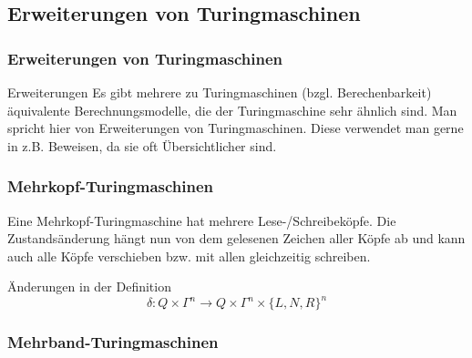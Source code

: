 \documentclass{beamer}
\begin{document}
{\subsection{Erweiterungen von Turingmaschinen}
\begin{frame}
\frametitle{Erweiterungen von Turingmaschinen}
\begin{block}{Erweiterungen}
Es gibt mehrere zu Turingmaschinen (bzgl. Berechenbarkeit) äquivalente Berechnungsmodelle, die der Turingmaschine sehr ähnlich sind. Man spricht hier von Erweiterungen von Turingmaschinen. Diese verwendet man gerne in z.B. Beweisen, da sie oft Übersichtlicher sind.
\end{block}
\end{frame}
\begin{frame}
\frametitle{Mehrkopf-Turingmaschinen}
\vspace{-2cm}
\begin{figure}[H]
\begin{center}
\end{center}
\end{figure}
Eine Mehrkopf-Turingmaschine hat mehrere Lese-/Schreibeköpfe. Die Zustandsänderung hängt nun von dem gelesenen Zeichen aller Köpfe ab und kann auch alle Köpfe verschieben bzw. mit allen gleichzeitig schreiben.
\begin{block}{Änderungen in der Definition}
$$ \delta: Q \times \Gamma^n \rightarrow Q \times \Gamma^n \times \{L,N,R\}^n$$
\end{block}
\end{frame}

\begin{frame}
\frametitle{Mehrband-Turingmaschinen}
\vspace{-2cm}
\begin{figure}[H]
\begin{center}
\end{center}
\end{figure}
\end{frame}}
\end{document}
